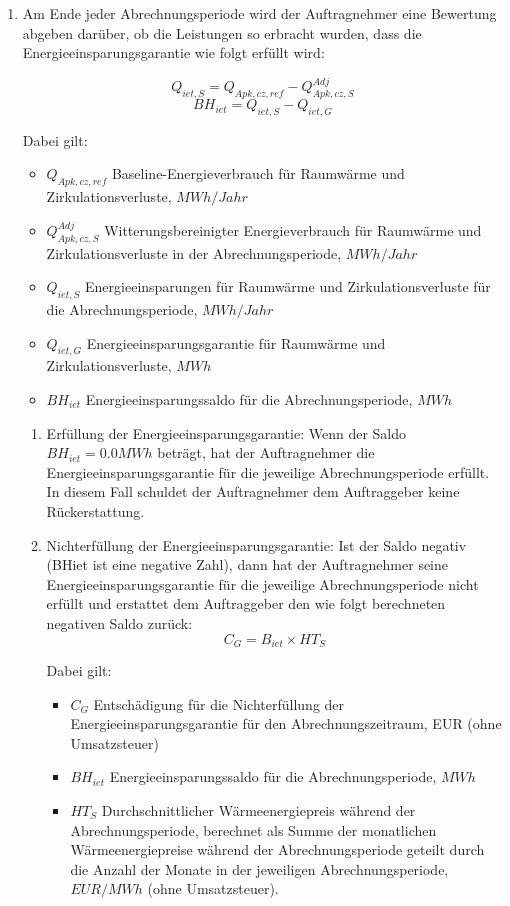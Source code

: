 \begin{enumerate}
\begin{enumerate}
\begin{enumerate}
    \item Am Ende jeder Abrechnungsperiode wird der Auftragnehmer eine Bewertung abgeben darüber, ob die Leistungen so erbracht wurden, dass die Energieeinsparungsgarantie wie folgt erfüllt wird:
      
\[ Q_{iet,S} = Q_{Apk,cz,ref} - Q^{Adj}_{Apk,cz,S} \]
\[ BH_{iet} = Q_{iet,S} - Q_{iet,G} \]

Dabei gilt:
\begin{itemize}[label={}]
\item $Q_{Apk,cz,ref}$ \quad Baseline-Energieverbrauch für Raumwärme und Zirkulationsverluste, $MWh/Jahr$
\item $Q^{Adj}_{Apk,cz,S}$ \quad Witterungsbereinigter Energieverbrauch für Raumwärme und Zirkulationsverluste in der Abrechnungsperiode, $MWh/Jahr$
\item $Q_{iet,S}$ \quad Energieeinsparungen für Raumwärme und Zirkulationsverluste für die Abrechnungsperiode,  $MWh/Jahr$
\item $Q_{iet,G}$ \quad Energieeinsparungsgarantie für Raumwärme und Zirkulationsverluste, $MWh$
\item $BH_{iet}$ \quad Energieeinsparungssaldo für die Abrechnungsperiode, $MWh$
\end{itemize}
\vspace{1cm}

\begin{enumerate}
	\item Erfüllung der Energieeinsparungsgarantie: Wenn der Saldo $BH_{iet}=0.0 MWh$ beträgt, hat der Auftragnehmer die Energieeinsparungsgarantie für die jeweilige Abrechnungsperiode erfüllt. In diesem Fall schuldet der Auftragnehmer dem Auftraggeber keine Rückerstattung.

        \item Nichterfüllung der Energieeinsparungsgarantie: Ist der Saldo negativ (BHiet ist eine negative Zahl), dann hat der Auftragnehmer seine Energieeinsparungsgarantie für die jeweilige Abrechnungsperiode nicht erfüllt und erstattet dem Auftraggeber den wie folgt berechneten negativen Saldo zurück:
          \[ C_G = B_{iet} \times HT_S \]

Dabei gilt:

\begin{itemize}[label={}]
	\item $C_G$ \quad \quad Entschädigung für die Nichterfüllung der Energieeinsparungsgarantie für den Abrechnungszeitraum, EUR (ohne Umsatzsteuer)
	\item $BH_{iet}$ \quad Energieeinsparungssaldo für die Abrechnungsperiode, $MWh$
	\item $HT_S$ \quad Durchschnittlicher Wärmeenergiepreis während der Abrechnungsperiode, berechnet als Summe der monatlichen Wärmeenergiepreise während der Abrechnungsperiode geteilt durch die Anzahl der Monate in der jeweiligen Abrechnungsperiode, $EUR/MWh$ (ohne Umsatzsteuer).
\end{itemize}


\end{enumerate}
\end{enumerate}
\end{enumerate}
\end{enumerate}
